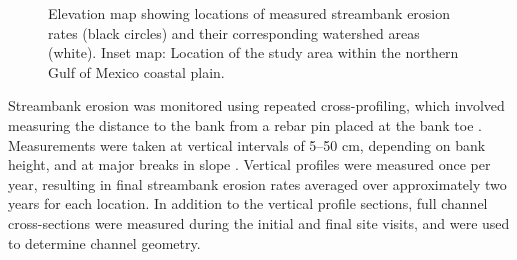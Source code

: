 \documentclass[preprint, review, authoryear, 12pt]{elsarticle}
\begin{document}
\begin{figure}
\centering
{}
\caption{Elevation map showing locations of measured streambank erosion rates (black circles) and their corresponding watershed areas (white). Inset map: Location of the study area within the northern Gulf of Mexico coastal plain.}\label{fig:sites}
\end{figure}

Streambank erosion was monitored using repeated cross-profiling, which involved measuring the distance to the bank from a rebar pin placed at the bank toe \citep{Lawler1993}. Measurements were taken at vertical intervals of 5--50 cm, depending on bank height, and at major breaks in slope \citep{Bangen2014}. Vertical profiles were measured once per year, resulting in final streambank erosion rates averaged over approximately two years for each location. In addition to the vertical profile sections, full channel cross-sections were measured during the initial and final site visits, and were used to determine channel geometry.
\end{document}
